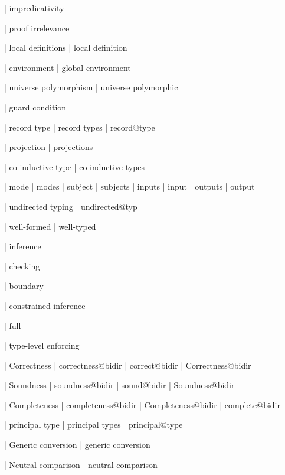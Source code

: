   | impredicativity

  | proof irrelevance

  | local definitions
  | local definition

  | environment
  | global environment

  | universe polymorphism
  | universe polymorphic

  | guard condition

  | record type
  | record types
  | record@type

  | projection
  | projections

  | co-inductive type
  | co-inductive types


  | mode
  | modes
  | subject
  | subjects
  | inputs
  | input
  | outputs
  | output

  | undirected typing
  | undirected@typ


  | well-formed
  | well-typed

  | inference

  | checking

  | boundary

  | constrained inference

  | full

  | type-level enforcing

  | Correctness
  | correctness@bidir
  | correct@bidir
  | Correctness@bidir

  | Soundness
  | soundness@bidir
  | sound@bidir
  | Soundness@bidir

  | Completeness
  | completeness@bidir
  | Completeness@bidir
  | complete@bidir


  | principal type
  | principal types
  | principal@type


  | Generic conversion
  | generic conversion

  | Neutral comparison
  | neutral comparison

